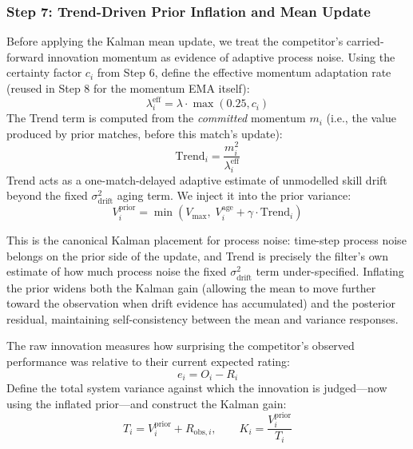 \documentclass[12pt]{article}
\newcommand{\sdrift}{\sigma_{\mathrm{drift}}^2}
\newcommand{\gammad}{\gamma}    %
\newcommand{\lambdad}{\lambda}  %
\begin{document}
	\subsubsection*{Step 7: Trend-Driven Prior Inflation and Mean Update}
	Before applying the Kalman mean update, we treat the competitor's carried-forward innovation momentum as evidence of adaptive process noise. Using the certainty factor $c_i$ from Step 6, define the effective momentum adaptation rate (reused in Step 8 for the momentum EMA itself):
	\begin{equation}
		\lambdad_i^{\mathrm{eff}} = \lambdad \cdot \max(0.25, c_i)
	\end{equation}
	The Trend term is computed from the \emph{committed} momentum $m_i$ (i.e., the value produced by prior matches, before this match's update):
	\begin{equation}
		\text{Trend}_i = \frac{m_i^2}{\lambdad_i^{\mathrm{eff}}}
	\end{equation}
	Trend acts as a one-match-delayed adaptive estimate of unmodelled skill drift beyond the fixed $\sdrift$ aging term. We inject it into the prior variance:
	\begin{equation}
		V_i^{\mathrm{prior}} = \min\!\left(V_{\max},\; V_i^{\mathrm{age}} + \gammad \cdot \text{Trend}_i\right)
	\end{equation}

	This is the canonical Kalman placement for process noise: time-step process noise belongs on the prior side of the update, and Trend is precisely the filter's own estimate of how much process noise the fixed $\sdrift$ term under-specified. Inflating the prior widens both the Kalman gain (allowing the mean to move further toward the observation when drift evidence has accumulated) and the posterior residual, maintaining self-consistency between the mean and variance responses.

	The raw innovation measures how surprising the competitor's observed performance was relative to their current expected rating:
	\begin{equation}
		e_i = O_i - R_i
	\end{equation}
	Define the total system variance against which the innovation is judged---now using the inflated prior---and construct the Kalman gain:
	\begin{equation}
		T_i = V_i^{\mathrm{prior}} + R_{\mathrm{obs},i}, \qquad K_i = \frac{V_i^{\mathrm{prior}}}{T_i}
	\end{equation}
\end{document}
